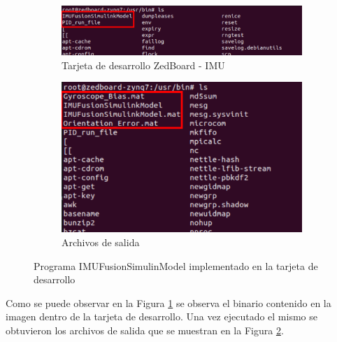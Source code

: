 \begin{figure}[htbp]
    \centering
    \begin{subfigure}[b]{0.35\textwidth}
        \centering
        \includegraphics[width=\textwidth]{fig/aditional/consola_pid_imu.pdf}
        \caption{Tarjeta de desarrollo ZedBoard - IMU}
        \label{fig:imu_zedboard}
    \end{subfigure}
    \hfill
    \begin{subfigure}[b]{0.45\textwidth}
        \centering
        \includegraphics[width=\textwidth]{fig/aditional/consola_imu.pdf}
        \caption{Archivos de salida}
        \label{fig:out_files_IMU}
    \end{subfigure}
    \caption{Programa IMUFusionSimulinModel implementado en la tarjeta de desarrollo}
    \label{fig:IMU_ZEDBOARD}
\end{figure}
Como se puede observar en la Figura \ref{fig:imu_zedboard} se observa el binario contenido en la imagen dentro de la tarjeta de desarrollo. Una vez ejecutado el mismo se obtuvieron los archivos de salida que se muestran en la Figura \ref{fig:out_files_IMU}. 

